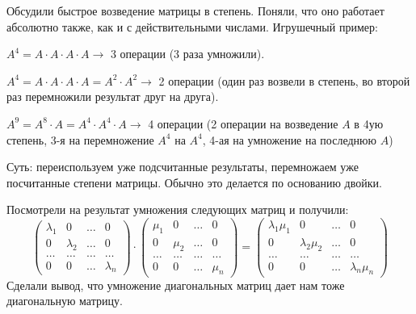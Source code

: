 \documentclass[12pt, a4paper]{extarticle}
\theoremstyle{definition}
\begin{document}
    Обсудили быстрое возведение матрицы в степень. Поняли, что оно работает абсолютно также, как и с действительными числами.
    Игрушечный пример:

    $A^4 = A \cdot A \cdot A \cdot A \to$  3 операции (3 раза умножили).

    $A^4 = A \cdot A \cdot A \cdot A = A^2 \cdot A^2 \to$ 2 операции (один раз возвели в степень, во второй раз перемножили результат друг на друга).

    $A^9 = A^8 \cdot A = A^4 \cdot A^4 \cdot A \to$ 4 операции
    (2 операции на возведение $A$ в 4ую степень, 3-я на перемножение $A^4$ на $A^4$, 4-ая на умножение на последнюю $A$)

    Суть: переиспользуем уже подсчитанные результаты, перемножаем уже посчитанные степени матрицы.
    Обычно это делается по основанию двойки.

    Посмотрели на результат умножения следующих матриц и получили:
    \[
    \begin{pmatrix}
        \lambda_1 & 0 & \dots & 0 \\
        0 & \lambda_2 & \dots & 0 \\
        \dots & \dots & \dots & \dots \\
        0 & 0 & \dots & \lambda_n
    \end{pmatrix}
    \cdot 
    \begin{pmatrix}
        \mu_1 & 0 & \dots & 0 \\
        0 & \mu_2 & \dots & 0 \\
        \dots & \dots & \dots & \dots \\
        0 & 0 & \dots & \mu_n
    \end{pmatrix}
    =
    \begin{pmatrix}
        \lambda_1 \mu_1 & 0 & \dots & 0 \\
        0 & \lambda_2 \mu_2 & \dots & 0 \\
        \dots & \dots & \dots & \dots \\
        0 & 0 & \dots & \lambda_n \mu_n
    \end{pmatrix}
    \]
    Сделали вывод, что умножение диагональных матриц дает нам тоже диагональную матрицу.
\end{document}
